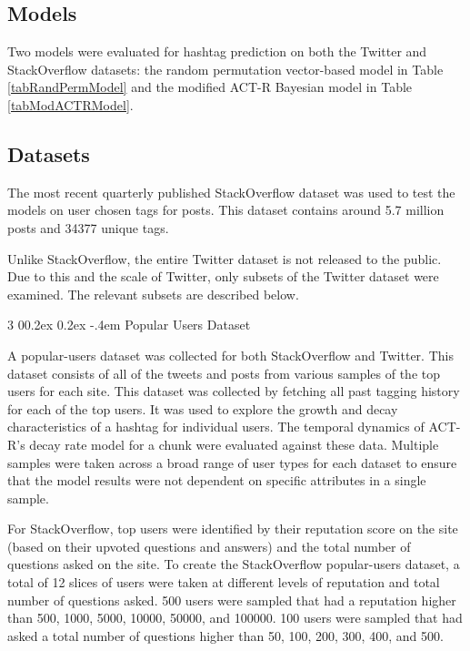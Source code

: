 \documentclass[man,floatsintext,donotrepeattitle]{apa6}
\makeatletter
\renewcommand{\subsubsection}{%
  \@startsection
  {subsubsection}%
  {3}%
  {\parindent}%
  {0\baselineskip \@plus 0.2ex \@minus 0.2ex}%
  {-.4em}%
  {\normalfont\normalsize\bfseries\addperi}}
\makeatother
\begin{document}
\subsection{Models}

Two models were evaluated for hashtag prediction on both the Twitter and StackOverflow datasets:
the random permutation vector-based model \parencite{Sahlgren2008} in Table \ref{tabRandPermModel} and 
the modified ACT-R Bayesian model \parencite{Stanley2013} in Table \ref{tabModACTRModel}.

\subsection{Datasets}

The most recent quarterly published StackOverflow dataset \parencite{DataDump2014} was used to test the models on user chosen tags for posts.
This dataset contains around \num{5.7} million posts and \num{34377} unique tags.

Unlike StackOverflow, the entire Twitter dataset is not released to the public.
Due to this and the scale of Twitter, only subsets of the Twitter dataset were examined.
The relevant subsets are described below.

\subsubsection{Popular Users Dataset}

A popular-users dataset was collected for both StackOverflow and Twitter.
This dataset consists of all of the tweets and posts from various samples of the top users for each site.
This dataset was collected by fetching all past tagging history for each of the top users.
It was used to explore the growth and decay characteristics of a hashtag for individual users.
The temporal dynamics of ACT-R's decay rate model for a chunk were evaluated against these data.
Multiple samples were taken across a broad range of user types for each dataset to ensure that the model results were not dependent on specific attributes in a single sample.

For StackOverflow, top users were identified by their reputation score on the site (based on their upvoted questions and answers) and the total number of questions asked on the site.
To create the StackOverflow popular-users dataset, a total of 12 slices of users were taken at different levels of reputation and total number of questions asked.
500 users were sampled that had a reputation higher than \num{500}, \num{1000}, \num{5000}, \num{10000}, \num{50000}, and \num{100000}.
100 users were sampled that had asked a total number of questions higher than \num{50}, \num{100}, \num{200}, \num{300}, \num{400}, and \num{500}.
\end{document}
